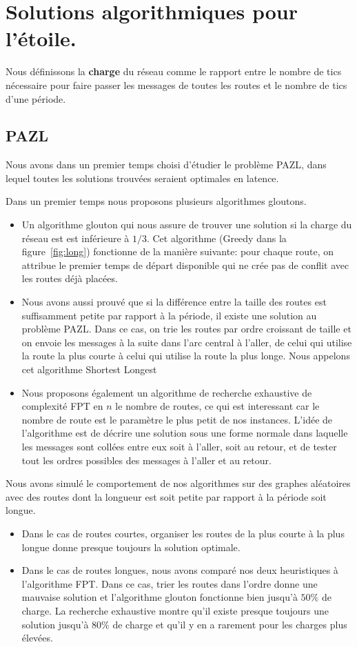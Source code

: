 \documentclass{article}
\begin{document}
\section{Solutions algorithmiques pour l'étoile.}

Nous définissons la {\bf charge} du réseau comme le rapport entre le nombre de tics nécessaire pour faire passer les messages de toutes les routes et le nombre de tics d'une période.

\subsection{PAZL}
 Nous avons dans un premier temps choisi d'étudier le problème PAZL, dans lequel toutes les solutions trouvées seraient optimales en latence.
 
 Dans un premier temps nous proposons plusieurs algorithmes gloutons.
 \begin{itemize}
 \item Un algorithme glouton qui nous assure de trouver une solution si la charge du réseau est est inférieure à $1/3$. Cet algorithme (Greedy dans la figure~\ref{fig:long}) fonctionne de la manière suivante: pour chaque route, on attribue le premier temps de départ disponible qui ne crée pas de conflit avec les routes déjà placées.
 \item  Nous avons aussi prouvé que si la différence entre la taille des routes est suffisamment petite par rapport à la période, il existe une solution au problème PAZL. Dans ce cas, on trie les routes par ordre croissant de taille et on envoie les messages à la suite dans l'arc central à l'aller, de celui qui utilise la route la plus courte à celui qui utilise la route la plus longe. Nous appelons cet algorithme Shortest Longest
 \item Nous proposons également un algorithme de recherche exhaustive de complexité FPT en $n$ le nombre de routes, ce qui est interessant car le nombre de route est le paramètre le plus petit de nos instances. L'idée de l'algorithme est de décrire une solution sous une forme normale dans laquelle les messages sont collées entre eux soit à l'aller, soit au retour, et de tester tout les ordres possibles des messages à l'aller et au retour.
 \end{itemize}
 
 Nous avons simulé le comportement de nos algorithmes sur des graphes aléatoires avec des routes dont la longueur est soit petite par rapport à la période soit longue. \begin{itemize}
 \item Dans le cas de routes courtes, organiser les routes de la plus courte à la plus longue donne presque toujours la solution optimale.
 \item Dans le cas de routes longues, nous avons comparé nos deux heuristiques à l'algorithme FPT. Dans ce cas, trier les routes dans l'ordre donne une mauvaise solution et
 l'algorithme glouton fonctionne bien jusqu'à $50\%$ de charge. La recherche exhaustive montre qu'il existe presque toujours une solution jusqu'à $80\%$ de charge et qu'il y en a rarement pour les charges plus élevées.
  \end{itemize}     
  
\end{document}
